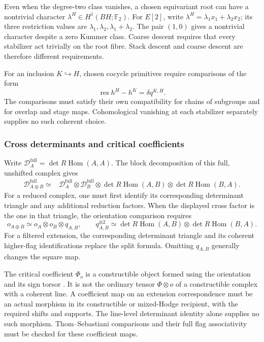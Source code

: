 Even when the degree-two class vanishes, a chosen equivariant root
can have a nontrivial character
\(\lambda^H\in H^1(BH;\mathbb F_2)\).
For \(E[2]\), write
\(\lambda^H=\lambda_1x_1+\lambda_2x_2\); its three restriction
values are \(\lambda_1,\lambda_2,\lambda_1+\lambda_2\).
The pair \((1,0)\) gives a nontrivial character despite a zero
Kummer class. Coarse descent requires that every stabilizer act
trivially on the root fibre. Stack descent and coarse descent are
therefore different requirements.

For an inclusion \(K\hookrightarrow H\), chosen cocycle
primitives require comparisons of the form
\[
 \operatorname{res}h^H-h^K=\delta q^{K,H}.
\]
The comparisons must satisfy their own compatibility for chains of
subgroups and for overlap and stage maps. Cohomological vanishing
at each stabilizer separately supplies no such coherent choice.

\subsubsection*{Cross determinants and critical coefficients}

Write \(\mathscr D_A^{\mathrm{full}}=\det R\operatorname{Hom}(A,A)\).
The block decomposition of this full, unshifted complex gives
\[
 \begin{split}
 \mathscr D_{A\oplus B}^{\mathrm{full}}\simeq{}&
 \mathscr D_A^{\mathrm{full}}\otimes\mathscr D_B^{\mathrm{full}}\otimes
 \det R\operatorname{Hom}(A,B)\otimes
 \det R\operatorname{Hom}(B,A).
 \end{split}
\]
For a reduced complex, one must first identify its corresponding
determinant triangle and any additional reduction factors. When
the displayed cross factor is the one in that triangle, the
orientation comparison requires
\[
 o_{A\oplus B}\simeq o_A\otimes o_B\otimes q_{A,B},
 \qquad
 q_{A,B}^{\otimes2}\simeq
 \det R\operatorname{Hom}(A,B)\otimes
 \det R\operatorname{Hom}(B,A).
\]
For a filtered extension, the corresponding determinant triangle
and its coherent higher-flag identifications replace the split
formula. Omitting \(q_{A,B}\) generally changes the square map.

The critical coefficient \(\Phi_o\) is a constructible object
formed using the orientation and its sign torsor
\cite{BBDJS2015,JoyceUpmeier,JoyceTanakaUpmeier}. It is not the
ordinary tensor \(\Phi\otimes o\) of a constructible complex
with a coherent line. A coefficient map on an extension
correspondence must be an actual morphism in its constructible or
mixed-Hodge recipient, with the required shifts and supports.
The line-level determinant identity alone supplies no such morphism.
Thom--Sebastiani comparisons and their full flag associativity must
be checked for these coefficient maps.

